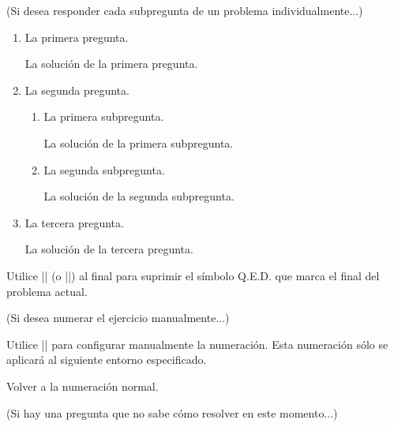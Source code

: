 \documentclass[11pt,
  logo = {example-image},
  title in boldface,
  theorem in new line,
  colored solution,
]{homework}
\begin{document}
\bigskip\textcolor{gray!55}{(Si desea responder cada subpregunta de un problema individualmente...)}

\begin{problem}
    \begin{enumerate}
        \item La primera pregunta.

        \begin{solution}
            La solución de la primera pregunta.
        \end{solution}

        \item La segunda pregunta.

        \begin{enumerate}
            \item La primera subpregunta.

            \begin{solution}
                La solución de la primera subpregunta.
            \end{solution}

            \item La segunda subpregunta.

            \begin{solution}
                La solución de la segunda subpregunta.
            \end{solution}

        \end{enumerate}

        \item La tercera pregunta.

        \begin{solution}
            La solución de la tercera pregunta.
        \end{solution}

    \end{enumerate}
    Utilice \cverb|\noqed| (o \cverb|\noQED|) al final para suprimir el símbolo Q.E.D. que marca el final del problema actual.
    \noQED
\end{problem}


\bigskip\textcolor{gray!55}{(Si desea numerar el ejercicio manualmente...)}

\begin{exercise}
    Utilice \cverb|\ManualNumbering| para configurar manualmente la numeración. Esta numeración sólo se aplicará al siguiente entorno especificado.
\end{exercise}

\begin{exercise}
    Volver a la numeración normal.
\end{exercise}


\bigskip\textcolor{gray!55}{(Si hay una pregunta que no sabe cómo resolver en este momento...)}

\end{document}
